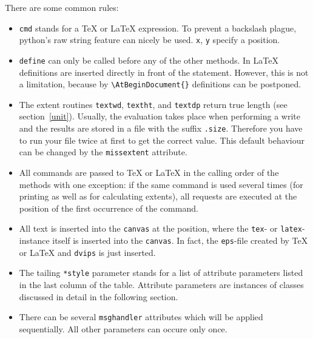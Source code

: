 There are some common rules:
\begin{itemize}
\item \verb|cmd| stands for a \TeX{} or \LaTeX{} expression. To
prevent a backslash plague, python's raw string feature can nicely be
used. \verb|x|, \verb|y| specify a position.
\item \verb|define| can only be called before any of the other
methods. In \LaTeX{} definitions are inserted directly in front of
the \verb|| statement. However, this is not a
limitation, because by \verb|\AtBeginDocument{}| definitions can be
postponed.
\item The extent routines \verb|textwd|, \verb|textht|, and
\verb|textdp| return true \PyX{} length (see section~\ref{unit}).
Usually, the evaluation takes place when performing a write and the
results are stored in a file with the suffix \verb|.size|. Therefore
you have to run your file twice at first to get the correct value.
This default behaviour can be changed by the \verb|missextent|
attribute.
\item All commands are passed to \TeX{} or \LaTeX{} in the calling
order of the methods with one exception: if the same command is used
several times (for printing as well as for calculating extents), all
requests are executed at the position of the first occurrence of the
command.
\item All text is inserted into the \verb|canvas| at the position,
where the \verb|tex|- or \verb|latex|-instance itself is inserted into
the \verb|canvas|. In fact, the \verb|eps|-file created by \TeX{} or
\LaTeX{} and \verb|dvips| is just inserted.
\item The tailing \verb|*style| parameter stands for a list of
attribute parameters listed in the last column of the table. Attribute
parameters are instances of classes discussed in detail in the
following section.
\item There can be several \verb|msghandler| attributes which will be
applied sequentially. All other parameters can occure only once.
\end{itemize}


